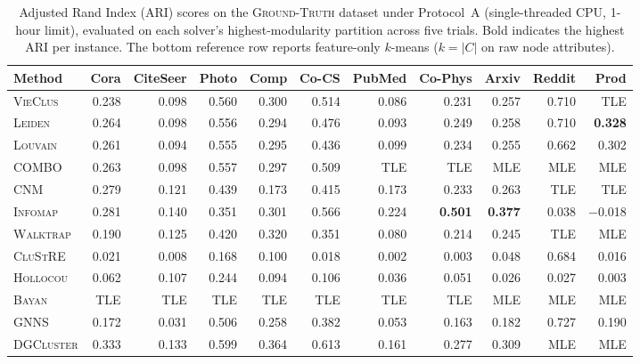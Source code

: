 \documentclass[11pt,a4paper]{article}
\begin{document}
\begin{table}[H]
    \centering
    \caption{Adjusted Rand Index (ARI) scores on the \textsc{Ground-Truth} dataset under Protocol~A (single-threaded CPU, 1-hour limit), evaluated on each solver's highest-modularity partition across five trials. Bold indicates the highest ARI per instance. The bottom reference row reports feature-only $k$-means ($k = |C|$ on raw node attributes).}
    \label{tab:ari_gt}
    \vspace{0.5em}
    \small
    \setlength{\tabcolsep}{3.5pt}
    \begin{tabular*}{\textwidth}{@{\extracolsep{\fill}}l rrrrrrrrrr@{}}
        \toprule
        Method & Cora & CiteSeer & Photo & Comp & Co-CS & PubMed & Co-Phys & Arxiv & Reddit & Prod \\
        \midrule
        \textsc{VieClus} & 0.238 & 0.098 & 0.560 & 0.300 & 0.514 & 0.086 & 0.231 & 0.257 & 0.710 & TLE \\
        \textsc{Leiden} & 0.264 & 0.098 & 0.556 & 0.294 & 0.476 & 0.093 & 0.249 & 0.258 & 0.710 & \textbf{0.328} \\
        \textsc{Louvain} & 0.261 & 0.094 & 0.555 & 0.295 & 0.436 & 0.099 & 0.234 & 0.255 & 0.662 & 0.302 \\
        \textsc{COMBO} & 0.263 & 0.098 & 0.557 & 0.297 & 0.509 & TLE & TLE & MLE & MLE & MLE \\
        \textsc{CNM} & 0.279 & 0.121 & 0.439 & 0.173 & 0.415 & 0.173 & 0.233 & 0.263 & TLE & TLE \\
        \textsc{Infomap} & 0.281 & 0.140 & 0.351 & 0.301 & 0.566 & 0.224 & \textbf{0.501} & \textbf{0.377} & 0.038 & $-$0.018 \\
        \textsc{Walktrap} & 0.190 & 0.125 & 0.420 & 0.320 & 0.351 & 0.080 & 0.214 & 0.245 & TLE & MLE \\
        \textsc{CluStRE} & 0.021 & 0.008 & 0.168 & 0.100 & 0.018 & 0.002 & 0.003 & 0.048 & 0.684 & 0.016 \\
        \textsc{Hollocou} & 0.062 & 0.107 & 0.244 & 0.094 & 0.106 & 0.036 & 0.051 & 0.026 & 0.027 & 0.003 \\
        \textsc{Bayan} & TLE & TLE & TLE & TLE & TLE & TLE & TLE & MLE & MLE & MLE \\
        \midrule
        \textsc{GNNS} & 0.172 & 0.031 & 0.506 & 0.258 & 0.382 & 0.053 & 0.163 & 0.182 & 0.727 & 0.190 \\
        \textsc{DGCluster} & 0.333 & 0.133 & 0.599 & 0.364 & 0.613 & 0.161 & 0.277 & 0.309 & MLE & MLE \\

\end{tabular*}
\end{table}
\end{document}
